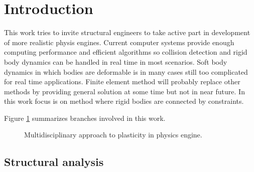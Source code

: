 \section{Introduction}

This work tries to invite structural engineers to take active part in development of more realistic physis engines.
Current computer systems provide enough computing performance and efficient algorithms so collision detection and 
rigid body dynamics can be handled in real time in most scenarios.
Soft body dynamics in which  bodies are deformable is in many cases still too complicated for real time applications.
Finite element method will probably replace other methods by providing general solution at some time but not in near future.
In this work focus is on method where rigid bodies are connected by constraints.



Figure \ref{fig:areas} summarizes branches involved in this work.

\begin{figure}[htb!]
\centering
{}
\caption{Multidisciplinary approach to plasticity in physics engine.}
\label{fig:areas}
\end{figure}

\subsection{Structural analysis}

